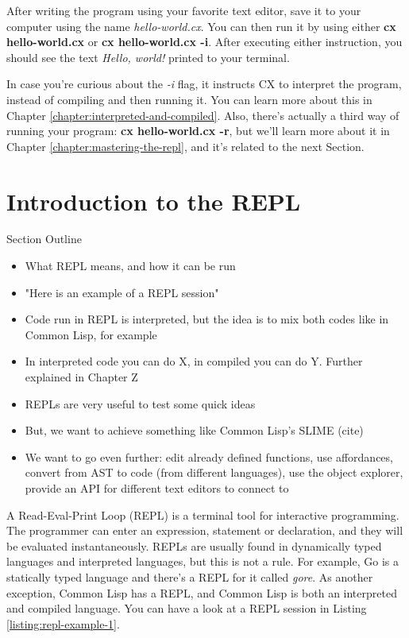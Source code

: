 \documentclass[11pt,fleqn,openany]{book} %
\begin{document}
After writing the program using your favorite text editor, save it to your computer using the name \emph{hello-world.cx}. You can then run it by using either \textbf{cx hello-world.cx} or \textbf{cx hello-world.cx -i}. After executing either instruction, you should see the text \textit{Hello, world!} printed to your terminal.

In case you're curious about the \emph{-i} flag, it instructs CX to interpret the program, instead of compiling and then running it. You can learn more about this in Chapter \ref{chapter:interpreted-and-compiled}. Also, there's actually a third way of running your program: \textbf{cx hello-world.cx -r}, but we'll learn more about it in Chapter \ref{chapter:mastering-the-repl}, and it's related to the next Section.

\section{Introduction to the REPL}
\label{Introduction to the REPL}

\begin{remark}
Section Outline
    \begin{itemize}
    	\item What REPL means, and how it can be run
        \item "Here is an example of a REPL session"
        \item Code run in REPL is interpreted, but the idea is to mix both codes like in Common Lisp, for example
        \item In interpreted code you can do X, in compiled you can do Y. Further explained in Chapter Z
        \item REPLs are very useful to test some quick ideas
        \item But, we want to achieve something like Common Lisp's SLIME (cite)
        \item We want to go even further: edit already defined functions, use affordances, convert from AST to code (from different languages), use the object explorer, provide an API for different text editors to connect to
    \end{itemize}
\end{remark}

A Read-Eval-Print Loop (REPL) is a terminal tool for interactive programming. The programmer can enter an expression, statement or declaration, and they will be evaluated instantaneously. REPLs are usually found in dynamically typed languages and interpreted languages, but this is not a rule. For example, Go is a statically typed language and there's a REPL for it called \emph{gore}. As another exception, Common Lisp has a REPL, and Common Lisp is both an interpreted and compiled language. You can have a look at a REPL session in Listing \ref{listing:repl-example-1}.
\end{document}
